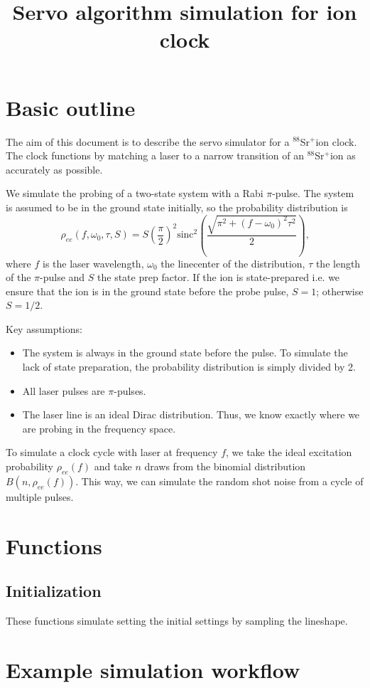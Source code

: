 \documentclass[a4paper,12pt]{article}
\title{Servo algorithm simulation for \sr ion clock}
\newcommand{\sr}{$^{88}$Sr$^+$}
\begin{document}
\maketitle

\section{Basic outline}

The aim of this document is to describe the servo simulator for a \sr ion clock.
The clock functions by matching a laser to a narrow transition of an \sr ion 
as accurately as possible.

We simulate the probing of a two-state system with a Rabi $\pi$-pulse.
The system is assumed to be in the ground state initially, so the probability
distribution is
\begin{equation}
    \rho_{ee}(f, \omega_0, \tau, S) = S \left( \frac{\pi}{2} \right)^2 \textrm{sinc}^2 
    \left( \frac{\sqrt{\pi^2 + (f-\omega_0)^2 \tau^2}}{2} \right) \text{,}
\end{equation}
where $f$ is the laser wavelength, $\omega_0$ the linecenter of the distribution,
$\tau$ the length of the $\pi$-pulse and $S$ the state prep factor.
If the ion is state-prepared i.e. we ensure that the ion is in the ground state
before the probe pulse, $S=1$; otherwise $S=1/2$.

Key assumptions:
\begin{itemize}
    \item The system is always in the ground state before the pulse.
    To simulate the lack of state preparation, the probability distribution
    is simply divided by 2.
    \item All laser pulses are $\pi$-pulses.
    \item The laser line is an ideal Dirac distribution.
    Thus, we know exactly where we are probing in the frequency space.
\end{itemize}

To simulate a clock cycle with laser at frequency $f$, we take the ideal excitation
probability $\rho_{ee}(f)$ and take $n$ draws from the binomial distribution
$B(n, \rho_{ee}(f))$.
This way, we can simulate the random shot noise from a cycle of multiple pulses.

\section{Functions}
\subsection{Initialization}
These functions simulate setting the initial settings by sampling the lineshape.
\subsubsection{}

\section{Example simulation workflow}
\end{document}
